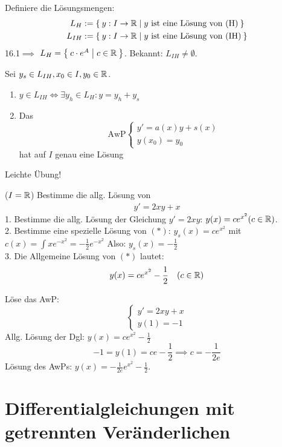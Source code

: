 \documentclass[a4paper,oneside,DIV15,BCOR12mm,chapterprefix=true,headings=onelinechapter]{scrbook}
\begin{document}
\begin{definition}
Definiere die Lösungsmengen:
\begin{align*}
    L_H   &:=\Set{y:I\to\ensuremath{\mathbb{R}}| y\text{ ist eine Lösung von (H)} }\\
    L_{IH}&:=\Set{y:I\to\ensuremath{\mathbb{R}}| y\text{ ist eine Lösung von (IH)}}
\end{align*}
16.1$\implies$ $L_H=\Set{c\cdot e^{A} | c\in \ensuremath{\mathbb{R}}}$. Bekannt: $L_{IH}\ne\emptyset$.
\end{definition}

\begin{satz}[Lösungen]
Sei $y_s\in L_{IH}, x_0\in I,y_0\in \mathbb{R}$.
\begin{enumerate}
\item $y\in L_{IH}\iff \exists y_h\in L_{H}: y=y_h+y_s$
\item Das
\[
\text{AwP}
\begin{cases}
y'=a(x)y+s(x)\\
y(x_0)=y_0
\end{cases}\]
hat auf $I$ genau eine Lösung
\end{enumerate}
\end{satz}

\begin{beweis}
Leichte Übung!
\end{beweis}

\begin{beispiele}
\item ($I=\mathbb{R}$) Bestimme die allg. Lösung von
\begin{align*}
y'=2xy+x\tag{$*$}
\end{align*}
1. Bestimme die allg. Lösung der Gleichung $y'=2xy$: $y(x)=ce^{x^2} (c\in\mathbb{R})$.\\
2. Bestimme eine spezielle Lösung von $(*)$: $y_s(x)=ce^{x^2}$ mit $c(x)=\int xe^{-x^2}=-\frac 12 e^{-x^2}$
Also: $y_s(x)=-\frac12$\\
3. Die Allgemeine Lösung von $(*)$ lautet: 
\[y(x)=ce^{x^2}-\frac 12 \quad(c\in\mathbb{R})\]
\item Löse das AwP:
\[\begin{cases}
y'=2xy+x\\
y(1)=-1
\end{cases}\]
Allg. Lösung der Dgl: $y(x)=ce^{x^2}-\frac 12$\\
\[-1=y(1)=ce-\frac 12\implies c=-\frac 1{2e}\]
Lösung des AwPs: $y(x)=-\frac1{2e}e^{x^2}-\frac 12$.
\end{beispiele}

\chapter{Differentialgleichungen mit getrennten Veränderlichen}
\end{document}
